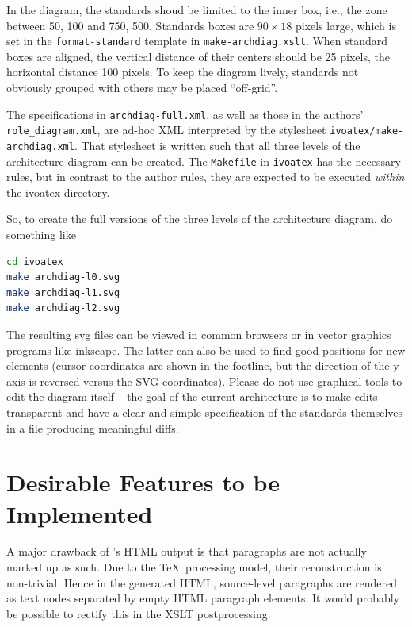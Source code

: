 \documentclass[11pt,a4paper]{ivoa}
\begin{document}
In the diagram, the standards shoud be limited to the inner box, i.e.,
the zone between 50, 100 and 750, 500.  Standards boxes are $90\times
18$ pixels large, which is set in the \texttt{format-standard} template
in \texttt{make-archdiag.xslt}.  When standard boxes are aligned, the
vertical distance of their centers should be 25 pixels, the horizontal
distance 100 pixels.  To keep the diagram lively, standards not
obviously grouped with others may be placed ``off-grid''.

The specifications in \texttt{archdiag-full.xml}, as well as those in
the authors' \texttt{role\_diagram.xml}, are ad-hoc XML interpreted by the
stylesheet \texttt{ivoatex/make-archdiag.xml}.  That stylesheet is
written such that all three levels of the architecture diagram can be
created.  The \texttt{Makefile} in \texttt{ivoatex} has the necessary
rules, but in contrast to the author rules, they are expected to be
executed \emph{within} the ivoatex directory.

So, to create the full versions of the three levels of the architecture
diagram, do something like

\begin{lstlisting}[language=sh]
cd ivoatex
make archdiag-l0.svg
make archdiag-l1.svg
make archdiag-l2.svg
\end{lstlisting}

The resulting svg files can be viewed in common browsers or in vector
graphics programs like inkscape.  The latter can also be used to find
good positions for new elements (cursor coordinates are shown in the
footline, but the direction of the y axis is reversed versus the SVG
coordinates).  Please do not use graphical tools to edit the diagram
itself -- the goal of the current architecture is to make edits
transparent and have a clear and simple specification of the standards
themselves in a file producing meaningful diffs.

\section{Desirable Features to be Implemented}

A major drawback of \ivoatex's HTML output is that paragraphs are not actually
marked up as such.  Due to the \TeX\ processing model, their
reconstruction is non-trivial.  Hence in the generated HTML,
source-level paragraphs are rendered as text nodes separated by empty
HTML paragraph elements.  It would probably be possible to rectify this
in the XSLT postprocessing.
\end{document}
